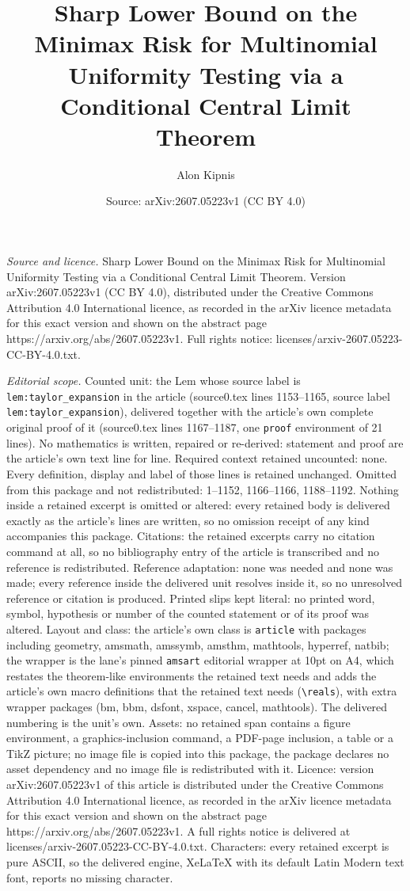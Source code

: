 \documentclass[10pt,a4paper]{amsart}
\title[Sharp Lower Bound on the Minimax Risk for Multinomial Unifor]{Sharp Lower Bound on the Minimax Risk for Multinomial Uniformity Testing via a Conditional Central Limit Theorem}
\author{Alon Kipnis}
\date{Source: arXiv:2607.05223v1 (CC BY 4.0)}
\begin{document}
\maketitle

\noindent\emph{Source and licence.} Sharp Lower Bound on the Minimax Risk for Multinomial Uniformity Testing via a Conditional Central Limit Theorem. Version arXiv:2607.05223v1 (CC BY 4.0), distributed under the Creative Commons Attribution 4.0 International licence, as recorded in the arXiv licence metadata for this exact version and shown on the abstract page https://arxiv.org/abs/2607.05223v1. Full rights notice: licenses/arxiv-2607.05223-CC-BY-4.0.txt.\par\smallskip

\noindent\textit{Editorial scope.} Counted unit: the Lem whose source label is \texttt{lem:taylor\_expansion} in the article (source0.tex lines 1153--1165, source label \texttt{lem:taylor\_expansion}), delivered together with the article's own complete original proof of it (source0.tex lines 1167--1187, one \texttt{proof} environment of 21 lines). No mathematics is written, repaired or re-derived: statement and proof are the article's own text line for line. Required context retained uncounted: none. Every definition, display and label of those lines is retained unchanged. Omitted from this package and not redistributed: 1--1152, 1166--1166, 1188--1192. Nothing inside a retained excerpt is omitted or altered: every retained body is delivered exactly as the article's lines are written, so no omission receipt of any kind accompanies this package. Citations: the retained excerpts carry no citation command at all, so no bibliography entry of the article is transcribed and no reference is redistributed. Reference adaptation: none was needed and none was made; every reference inside the delivered unit resolves inside it, so no unresolved reference or citation is produced. Printed slips kept literal: no printed word, symbol, hypothesis or number of the counted statement or of its proof was altered. Layout and class: the article's own class is \texttt{article} with packages including geometry, amsmath, amssymb, amsthm, mathtools, hyperref, natbib; the wrapper is the lane's pinned \texttt{amsart} editorial wrapper at 10pt on A4, which restates the theorem-like environments the retained text needs and adds the article's own macro definitions that the retained text needs (\texttt{\textbackslash reals}), with extra wrapper packages (bm, bbm, dsfont, xspace, cancel, mathtools). The delivered numbering is the unit's own. Assets: no retained span contains a figure environment, a graphics-inclusion command, a PDF-page inclusion, a table or a TikZ picture; no image file is copied into this package, the package declares no asset dependency and no image file is redistributed with it. Licence: version arXiv:2607.05223v1 of this article is distributed under the Creative Commons Attribution 4.0 International licence, as recorded in the arXiv licence metadata for this exact version and shown on the abstract page https://arxiv.org/abs/2607.05223v1. A full rights notice is delivered at licenses/arxiv-2607.05223-CC-BY-4.0.txt. Characters: every retained excerpt is pure ASCII, so the delivered engine, XeLaTeX with its default Latin Modern text font, reports no missing character.
\end{document}
